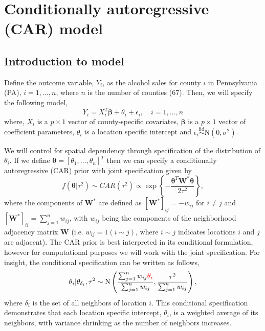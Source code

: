 \documentclass[12pt]{article} %
\theoremstyle{plain}
\theoremstyle{definition}
\theoremstyle{remark}
\begin{document}
\section*{Conditionally autoregressive (CAR) model}

\subsection*{Introduction to model}

Define the outcome variable, $Y_{i}$, as the alcohol sales for county $i$ in Pennsylvania (PA), $i=1,\ldots,n$, where $n$ is the number of counties (67). Then, we will specify the following model,
$$Y_{i}=X_{i}^T\boldsymbol{\beta}+\theta_i+\epsilon_i, \quad i=1,\ldots,n$$
where, $X_i$ is a $p \times 1$ vector of county-specific covariates, $\boldsymbol{\beta}$ is a $p \times 1$ vector of coefficient parameters, $\theta_i$ is a location specific intercept and $\epsilon_i \stackrel{\text{iid}}{\sim}\text{N}\left(0,\sigma^2\right)$. 

We will control for spatial dependency through specification of the distribution of $\theta_i$. If we define $\boldsymbol{\theta}=[\theta_1,\ldots,\theta_n]^T$ then we can specify a conditionally autoregressive (CAR) prior with joint specification given by
\begin{equation}\label{eq:CARjointprior}
f\left(\boldsymbol{\theta}|\tau^2\right)\sim {CAR}(\tau^2) \propto \exp\left\{-\frac{\boldsymbol{\theta}^T\mathbf{W}^*\boldsymbol{\theta}}{2\tau^2}\right\},
\end{equation}
where the components of $\mathbf{W}^*$ are defined as $[\mathbf{W}^*]_{ij}=-w_{ij}$ for $i \neq j$ and $[\mathbf{W}^*]_{ii}=\sum_{j=1}^n w_{ij}$, with $w_{ij}$ being the components of the neighborhood adjacency matrix $\mathbf{W}$ (i.e. $w_{ij}=1(i\sim j)$, where $i\sim j$ indicates locations $i$ and $j$ are adjacent). The CAR prior is best interpreted in its conditional formulation, however for computational purposes we will work with the joint specification. For insight, the conditional specification can be written as follows, 
\[
\theta_i | \theta_{\delta_i},\tau^2 \sim \text{N}\left(\frac{\sum_{j=1}^n w_{ij} \color{red}{\theta_i}}{\sum_{j=1}^n w_{ij}},\frac{\tau^2}{\sum_{j=1}^n w_{ij}}\right),
\]
where $\delta_i$ is the set of all neighbors of location $i$. This conditional specification demonstrates that each location specific intercept, $\theta_i$, is a weighted average of its neighbors, with variance shrinking as the number of neighbors increases.
\end{document}

